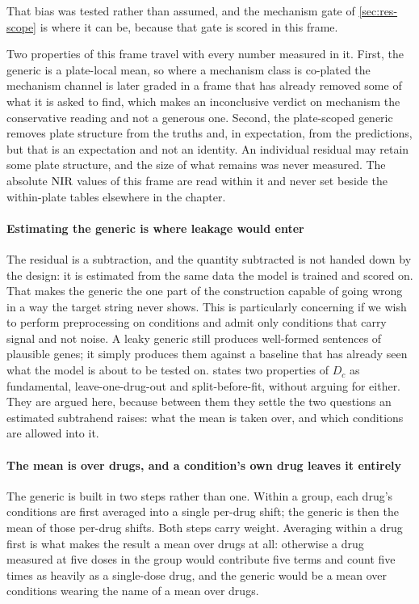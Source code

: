   That bias was tested rather than assumed, and the mechanism gate of
  \cref{sec:res-scope} is where it can be, because that gate is scored in this
  frame.

  \begin{scopelimit}
  Two properties of this frame travel with every number measured in it. First, the
  generic is a plate-local mean, so where a mechanism class is co-plated the
  mechanism channel is later graded in a frame that has already removed some of what
  it is asked to find, which makes an inconclusive verdict on mechanism the
  conservative reading and not a generous one. Second, the plate-scoped generic
  removes plate structure from the truths and, in expectation, from the predictions,
  but that is an expectation and not an identity. An individual residual may retain
  some plate structure, and the size of what remains was never measured. The absolute
  $\textrm{NIR}$ values of this frame are read within it and never set beside the
  within-plate tables elsewhere in the chapter.
  \end{scopelimit}
  
\paragraph{Estimating the generic is where leakage would enter} The residual is a
subtraction, and the quantity subtracted is not handed down by the design: it is
estimated from the same data the model is trained and scored on. That makes the
generic the one part of the construction capable of going wrong in a way the
target string never shows. This is particularly concerning if we wish to perform preprocessing on conditions and admit only conditions that carry signal and not noise. A leaky generic still produces well-formed sentences of
plausible genes; it simply produces them against a baseline that has already seen
what the model is about to be tested on.  states two
properties of $D_c$ as fundamental, leave-one-drug-out and split-before-fit,
without arguing for either. They are argued here, because between them they settle
the two questions an estimated subtrahend raises: what the mean is taken over, and
which conditions are allowed into it.

\paragraph{The mean is over drugs, and a condition's own drug leaves it entirely}
The generic is built in two steps rather than one. Within a group, each drug's
conditions are first averaged into a single per-drug shift; the generic is then the
mean of those per-drug shifts. Both steps carry weight. Averaging within a drug
first is what makes the result a mean over drugs at all: otherwise a drug measured
at five doses in the group would contribute five terms and count five times as
heavily as a single-dose drug, and the generic would be a mean over conditions
wearing the name of a mean over drugs.

